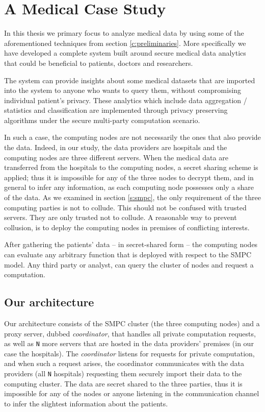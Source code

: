 \chapter{A Medical Case Study}\label{c:medical-study}

In this thesis we primary focus to analyze medical data by using some of the aforementioned techniques from section \ref{c:preliminaries}.
More specifically we have developed a complete system built around secure medical data analytics that could be beneficial to patients, doctors and researchers.

The system can provide insights about some medical datasets that are imported into the system to anyone who wants to query them, without compromising individual patient's privacy.
These analytics which include data aggregation / statistics and classification are implemented through privacy preserving algorithms under the secure multi-party computation scenario.

In such a case, the computing nodes are not necessarily the ones that also provide the data.
Indeed, in our study, the data providers are hospitals and the computing nodes are three different servers.
When the medical data are transferred from the hospitals to the computing nodes, a secret sharing scheme is applied; thus it is impossible for any of the three nodes to decrypt them, and in general to infer any information, as each computing node possesses only a share of the data.
As we examined in section \ref{s:smpc}, the only requirement of the three computing parties is not to collude.
This should not be confused with trusted servers.
They are only trusted not to collude.
A reasonable way to prevent collusion, is to deploy the computing nodes in premises of conflicting interests.


After gathering the patients' data -- in secret-shared form -- the computing nodes can evaluate any arbitrary function that is deployed with respect to the SMPC model.
Any third party or analyst, can query the cluster of nodes and request a computation.


\section{Our architecture }\label{s:architecture}
Our architecture consists of the SMPC cluster (the three computing nodes) and a proxy server, dubbed \textit{coordinator}, that handles all private computation requests, as well as \texttt{N} more servers that are hosted in the data providers' premises (in our case the hospitals).
The \textit{coordinator} listens for requests for private computation, and when such a request arises, the coordinator communicates with the data providers (all \texttt{N} hospitals) requesting them securely import their data to the computing cluster.
The data are secret shared to the three parties, thus it is impossible for any of the nodes or anyone listening in the communication channel to infer the slightest information about the patients.



